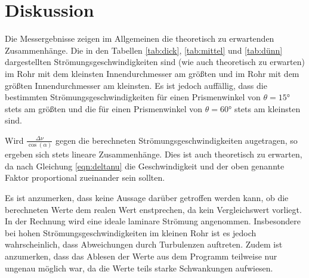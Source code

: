 \section{Diskussion}
\label{sec:Diskussion}

Die Messergebnisse zeigen im Allgemeinen die theoretisch zu erwartenden Zusammenhänge.
Die in den Tabellen \ref{tab:dick}, \ref{tab:mittel} und \ref{tab:dünn} dargestellten
Strömungsgeschwindigkeiten sind (wie auch theoretisch zu erwarten) im Rohr mit
dem kleinsten Innendurchmesser am größten und im Rohr mit dem größten Innendurchmesser
am kleinsten. Es ist jedoch auffällig, dass die bestimmten Strömungsgeschwindigkeiten
für einen Prismenwinkel von $\theta=15°$ stets am größten und die für einen Prismenwinkel
von $\theta=60°$ stets am kleinsten sind.

Wird $\frac{\Delta \nu}{\cos(\alpha)}$ gegen die berechneten Strömungsgeschwindigkeiten
augetragen, so ergeben sich stets lineare Zusammenhänge. Dies ist auch theoretisch zu
erwarten, da nach Gleichung \eqref{eqn:deltanu} die Geschwindigkeit und der oben genannte
Faktor proportional zueinander sein sollten.

Es ist anzumerken, dass keine Aussage darüber getroffen werden kann, ob die berechneten
Werte dem realen Wert enstprechen, da kein Vergleichswert vorliegt. In der
Rechnung wird eine ideale laminare Strömung angenommen.
Insbesondere bei hohen Strömungsgeschwindigkeiten im kleinen Rohr ist es jedoch
wahrscheinlich, dass Abweichungen durch Turbulenzen auftreten.
Zudem ist anzumerken, dass das Ablesen der Werte aus dem Programm teilweise nur
ungenau möglich war, da die Werte teils starke Schwankungen aufwiesen.

